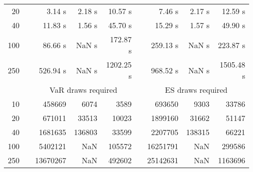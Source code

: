 {{\begin{longtable}{rr rrr r rrr}
20 & & 3.14 s & 2.18 s & 10.57 s && 7.46 s & 2.17 s & 12.59 s \\ 
40 & & 11.83 s & 1.56 s & 45.70 s && 15.29 s & 1.57 s & 49.90 s \\ 
100 & & 86.66 s &  NaN s & 172.87 s && 259.13 s &  NaN s & 223.87 s \\ 
250 & & 526.94 s &  NaN s & 1202.25 s && 968.52 s &  NaN s & 1505.48 s \\ 
\hline 
 && \multicolumn{3}{c}{VaR draws required} &&   \multicolumn{3}{c}{ES draws required} \\  \cline{3-5}  \cline{7-9} 
10 & & 458669 & 6074 & 3589 && 693650 & 9303 & 33786 \\ 
20 & & 671011 & 33513 & 10023 && 1899160 & 31662 & 51147 \\ 
40 & & 1681635 & 136803 & 33599 && 2207705 & 138315 & 66221 \\ 
100 & & 5402121 & NaN & 105572 && 16251791 & NaN & 299586 \\ 
250 & & 13670267 & NaN & 492602 && 25142631 & NaN & 1163696 \\ 
\hline 
\end{longtable} 
} 
} 
